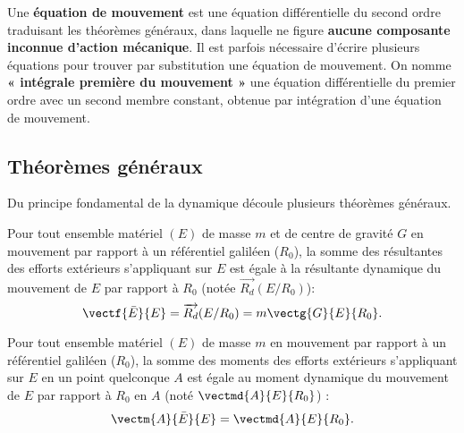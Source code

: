 \begin{defi}

Une \textbf{équation de mouvement} est une équation différentielle du second ordre traduisant les théorèmes généraux, dans laquelle ne figure \textbf{aucune composante inconnue d'action mécanique}. Il est parfois nécessaire d'écrire plusieurs équations pour trouver par substitution une équation de mouvement. On nomme \textbf{« intégrale première du mouvement »} une équation différentielle du premier ordre avec un second membre constant, obtenue par  intégration d'une équation de mouvement. 
\end{defi}

\subsection{Théorèmes généraux}

Du principe fondamental de la dynamique découle plusieurs théorèmes généraux.

\begin{theoreme}
			Pour tout ensemble matériel $(E)$ de masse $m$ et de centre de gravité $G$ en mouvement par rapport à un référentiel galiléen ($R_0$), la somme des résultantes des efforts extérieurs s'appliquant sur $E$ est égale à la résultante dynamique du mouvement de $E$ par rapport à $R_0$ (notée $\overrightarrow{R_d}(E/R_0)$): 
$$\vectf{\bar E}{E}=\overrightarrow{R_d}(E/R_0)=m\vectg{G}{E}{R_0}.$$
\end{theoreme}

\begin{theoreme}

			Pour tout ensemble matériel $(E)$ de masse $m$ en mouvement par rapport à un référentiel galiléen ($R_0$), la somme des moments des efforts extérieurs s'appliquant sur $E$ en un point quelconque $A$ est égale au moment dynamique du mouvement de $E$ par rapport à $R_0$ en $A$ (noté $\vectmd{A}{E}{R_0}$) : 
$$\vectm{A}{\bar E}{E}=\vectmd{A}{E}{R_0}.$$
\end{theoreme}

